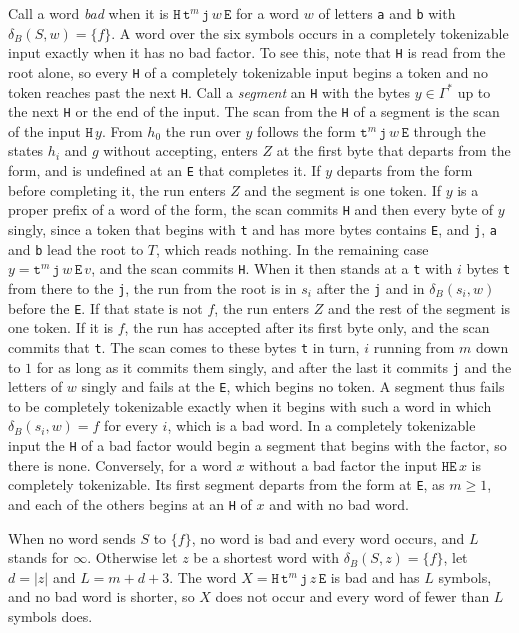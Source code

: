 \documentclass[11pt,a4paper]{article}
\theoremstyle{definition}
\theoremstyle{plain}
\newcommand{\code}[1]{\texttt{#1}}
\begin{document}
Call a word \emph{bad} when it is $\code{H}\, \code{t}^m\, \code{j}\, w\, \code{E}$ for a word $w$ of letters \code{a}
and \code{b} with $\delta_B(S, w) = \{f\}$. A word over the six symbols occurs in a completely tokenizable input exactly
when it has no bad factor. To see this, note that \code{H} is read from the root alone, so every \code{H} of a
completely tokenizable input begins a token and no token reaches past the next \code{H}. Call a \emph{segment} an
\code{H} with the bytes $y \in \Gamma^*$ up to the next \code{H} or the end of the input. The scan from the \code{H} of
a segment is the scan of the input $\code{H}\, y$. From $h_0$ the run over $y$ follows the form
$\code{t}^m\, \code{j}\, w\, \code{E}$ through the states $h_i$ and $g$ without accepting, enters $Z$ at the first byte
that departs from the form, and is undefined at an \code{E} that completes it. If $y$ departs from the form before
completing it, the run enters $Z$ and the segment is one token. If $y$ is a proper prefix of a word of the form, the
scan commits \code{H} and then every byte of $y$ singly, since a token that begins with \code{t} and has more bytes
contains \code{E}, and \code{j}, \code{a} and \code{b} lead the root to $T$, which reads nothing. In the remaining case
$y = \code{t}^m\, \code{j}\, w\, \code{E}\, v$, and the scan commits \code{H}. When it then stands at a \code{t} with
$i$ bytes \code{t} from there to the \code{j}, the run from the root is in $s_i$ after the \code{j} and in
$\delta_B(s_i, w)$ before the \code{E}. If that state is not $f$, the run enters $Z$ and the rest of the segment is one
token. If it is $f$, the run has accepted after its first byte only, and the scan commits that \code{t}. The scan comes
to these bytes \code{t} in turn, $i$ running from $m$ down to $1$ for as long as it commits them singly, and after the
last it commits \code{j} and the letters of $w$ singly and fails at the \code{E}, which begins no token. A segment thus
fails to be completely tokenizable exactly when it begins with such a word in which $\delta_B(s_i, w) = f$ for every
$i$, which is a bad word. In a completely tokenizable input the \code{H} of a bad factor would begin a segment that
begins with the factor, so there is none. Conversely, for a word $x$ without a bad factor the input
$\code{H}\code{E}\, x$ is completely tokenizable. Its first segment departs from the form at \code{E}, as $m \geq 1$,
and each of the others begins at an \code{H} of $x$ and with no bad word.

When no word sends $S$ to $\{f\}$, no word is bad and every word occurs, and $L$ stands for $\infty$. Otherwise let $z$
be a shortest word with $\delta_B(S, z) = \{f\}$, let $d = |z|$ and $L = m + d + 3$. The word
$X = \code{H}\, \code{t}^m\, \code{j}\, z\, \code{E}$ is bad and has $L$ symbols, and no bad word is shorter, so $X$
does not occur and every word of fewer than $L$ symbols does.
\end{document}
